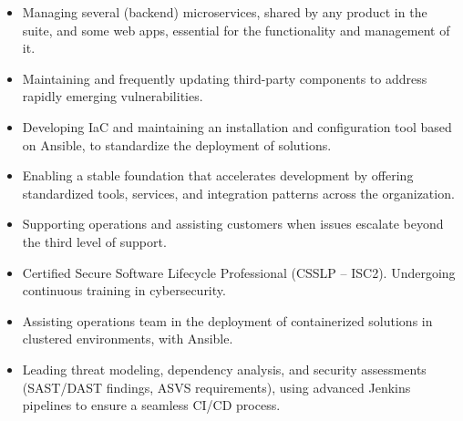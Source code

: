 
\iflongversion
	\begin{itemize}
		\item Managing several (backend) microservices, shared by any product in the suite, and some web apps, essential for the functionality and management of it.
		\item Maintaining and frequently updating third-party components to address rapidly emerging vulnerabilities.
		\item  Developing IaC and maintaining an installation and configuration tool based on Ansible, to standardize the deployment of solutions.
		\item Enabling a stable foundation that accelerates development by offering standardized tools, services, and integration patterns across the organization.
		\item Supporting operations and assisting customers when issues escalate beyond the third level of support.
	\end{itemize}
	\smallskip

	\medskip

	\begin{itemize}
		\item Certified Secure Software Lifecycle Professional (CSSLP – ISC2). Undergoing continuous training in cybersecurity.
		\item Assisting operations team in the deployment of containerized solutions in clustered environments, with Ansible.
		\item Leading threat modeling, dependency analysis, and security assessments (SAST/DAST findings, ASVS requirements), using advanced Jenkins pipelines to ensure a seamless CI/CD process.
	\end{itemize}
	\smallskip

	\medskip

